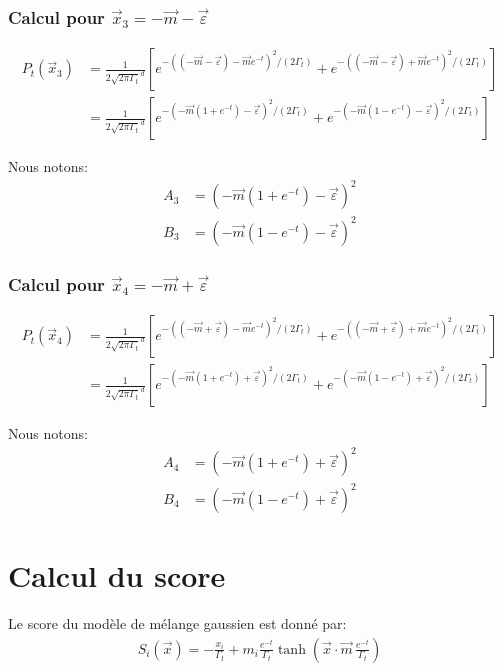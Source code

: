 \documentclass[11pt,a4paper]{article}
\begin{document}
\subsubsection{Calcul pour $\vec{x}_3 = -\vec{m} - \vec{\varepsilon}$}

\begin{align}
P_t(\vec{x}_3) &= \frac{1}{2\sqrt{2\pi\Gamma_t}^d}\left[
e^{-((-\vec{m}-\vec{\varepsilon})-\vec{m} e^{-t})^2/(2 \Gamma_t)}
+e^{-((-\vec{m}-\vec{\varepsilon})+\vec{m} e^{-t})^2/(2 \Gamma_t)}
\right] \\
&= \frac{1}{2\sqrt{2\pi\Gamma_t}^d}\left[
e^{-(-\vec{m}(1+e^{-t})-\vec{\varepsilon})^2/(2 \Gamma_t)}
+e^{-(-\vec{m}(1-e^{-t})-\vec{\varepsilon})^2/(2 \Gamma_t)}
\right]
\end{align}

Nous notons:
\begin{align}
A_3 &= (-\vec{m}(1+e^{-t})-\vec{\varepsilon})^2 \\
B_3 &= (-\vec{m}(1-e^{-t})-\vec{\varepsilon})^2
\end{align}

\subsubsection{Calcul pour $\vec{x}_4 = -\vec{m} + \vec{\varepsilon}$}

\begin{align}
P_t(\vec{x}_4) &= \frac{1}{2\sqrt{2\pi\Gamma_t}^d}\left[
e^{-((-\vec{m}+\vec{\varepsilon})-\vec{m} e^{-t})^2/(2 \Gamma_t)}
+e^{-((-\vec{m}+\vec{\varepsilon})+\vec{m} e^{-t})^2/(2 \Gamma_t)}
\right] \\
&= \frac{1}{2\sqrt{2\pi\Gamma_t}^d}\left[
e^{-(-\vec{m}(1+e^{-t})+\vec{\varepsilon})^2/(2 \Gamma_t)}
+e^{-(-\vec{m}(1-e^{-t})+\vec{\varepsilon})^2/(2 \Gamma_t)}
\right]
\end{align}

Nous notons:
\begin{align}
A_4 &= (-\vec{m}(1+e^{-t})+\vec{\varepsilon})^2 \\
B_4 &= (-\vec{m}(1-e^{-t})+\vec{\varepsilon})^2
\end{align}

\section{Calcul du score}

Le score du modèle de mélange gaussien est donné par:
\begin{align}
S_i(\vec{x}) = -\frac{x_i}{\Gamma_t}+m_i \frac{e^{-t}}{\Gamma_t}\tanh\left( \vec{x} \cdot \vec{m} \, \frac{e^{-t}}{\Gamma_t}\right)
\end{align}
\end{document}
